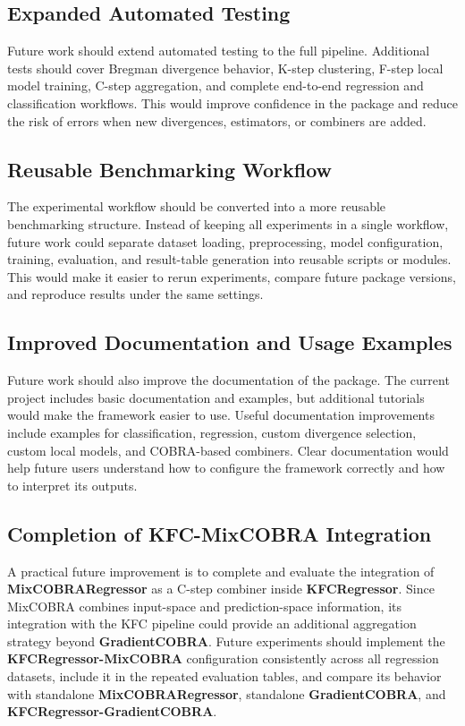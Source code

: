 \subsection{Expanded Automated Testing}

\hs Future work should extend automated testing to the full \KFCProcedure{} pipeline. Additional tests should cover Bregman divergence behavior, K-step clustering, F-step local model training, C-step aggregation, and complete end-to-end regression and classification workflows. This would improve confidence in the package and reduce the risk of errors when new divergences, estimators, or combiners are added.

\subsection{Reusable Benchmarking Workflow}

\hs The experimental workflow should be converted into a more reusable benchmarking structure. Instead of keeping all experiments in a single workflow, future work could separate dataset loading, preprocessing, model configuration, training, evaluation, and result-table generation into reusable scripts or modules. This would make it easier to rerun experiments, compare future package versions, and reproduce results under the same settings.

\subsection{Improved Documentation and Usage Examples}

\hs Future work should also improve the documentation of the package. The current project includes basic documentation and examples, but additional tutorials would make the framework easier to use. Useful documentation improvements include examples for classification, regression, custom divergence selection, custom local models, and COBRA-based combiners. Clear documentation would help future users understand how to configure the framework correctly and how to interpret its outputs.

\subsection{Completion of KFC-MixCOBRA Integration}

\hs A practical future improvement is to complete and evaluate the integration of \textbf{MixCOBRARegressor} as a C-step combiner inside \textbf{KFCRegressor}. Since MixCOBRA combines input-space and prediction-space information, its integration with the KFC pipeline could provide an additional aggregation strategy beyond \textbf{GradientCOBRA}. Future experiments should implement the \textbf{KFCRegressor-MixCOBRA} configuration consistently across all regression datasets, include it in the repeated evaluation tables, and compare its behavior with standalone \textbf{MixCOBRARegressor}, standalone \textbf{GradientCOBRA}, and \textbf{KFCRegressor-GradientCOBRA}.

